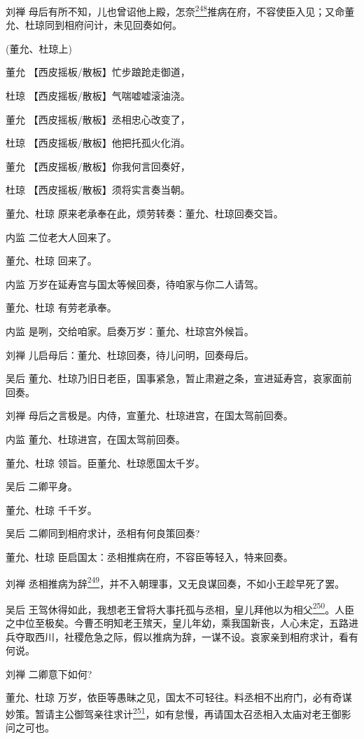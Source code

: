 刘禅
母后有所不知，儿也曾诏他上殿，怎奈\protect\hyperlink{fn248}{\textsuperscript{248}}推病在府，不容使臣入见；又命董允、杜琼同到相府问计，未见回奏如何。

(董允、杜琼上)

董允 【西皮摇板/散板】忙步踉跄走御道，

杜琼 【西皮摇板/散板】气喘嘘嘘滚油浇。

董允 【西皮摇板/散板】丞相忠心改变了，

杜琼 【西皮摇板/散板】他把托孤火化消。

董允 【西皮摇板/散板】你我何言回奏好，

杜琼 【西皮摇板/散板】须将实言奏当朝。

董允、杜琼 原来老承奉在此，烦劳转奏：董允、杜琼回奏交旨。

内监 二位老大人回来了。

董允、杜琼 回来了。

内监 万岁在延寿宫与国太等候回奏，待咱家与你二人请驾。

董允、杜琼 有劳老承奉。

内监 是咧，交给咱家。启奏万岁：董允、杜琼宫外候旨。

刘禅 儿启母后：董允、杜琼回奏，待儿问明，回奏母后。

吴后
董允、杜琼乃旧日老臣，国事紧急，暂止肃避之条，宣进延寿宫，哀家面前回奏。

刘禅 母后之言极是。内侍，宣董允、杜琼进宫，在国太驾前回奏。

内监 董允、杜琼进宫，在国太驾前回奏。

董允、杜琼 领旨。臣董允、杜琼愿国太千岁。

吴后 二卿平身。

董允、杜琼 千千岁。

吴后 二卿同到相府求计，丞相有何良策回奏?

董允、杜琼 臣启国太：丞相推病在府，不容臣等轻入，特来回奏。

刘禅
丞相推病为辞\protect\hyperlink{fn249}{\textsuperscript{249}}，并不入朝理事，又无良谋回奏，不如小王趁早死了罢。

吴后
王驾休得如此，我想老王曾将大事托孤与丞相，皇儿拜他以为相父\protect\hyperlink{fn250}{\textsuperscript{250}}。人臣之中位至极矣。今曹丕明知老王殡天，皇儿年幼，乘我国新丧，人心未定，五路进兵夺取西川，社稷危急之际，假以推病为辞，一谋不设。哀家亲到相府求计，看有何说。

刘禅 二卿意下如何?

董允、杜琼
万岁，依臣等愚昧之见，国太不可轻往。料丞相不出府门，必有奇谋妙策。暂请主公御驾亲往求计\protect\hyperlink{fn251}{\textsuperscript{251}}，如有怠慢，再请国太召丞相入太庙对老王御影问之可也。

